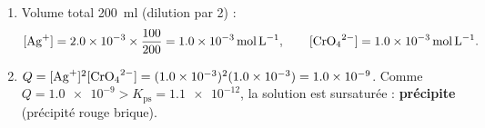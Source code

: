 \documentclass[11pt,a4paper]{article}
\begin{document}
\begin{corrige}
\begin{enumerate}[label=\alph*)]
  \item Volume total \qty{200}{\milli\litre} (dilution par 2) :
        \[ [\ce{Ag+}] = \num{2.0e-3}\times\dfrac{100}{200} = \qty{1.0e-3}{\mole\per\litre}, \qquad
           [\ce{CrO4^{2-}}] = \qty{1.0e-3}{\mole\per\litre}. \]
  \item $Q = [\ce{Ag+}]^{2}[\ce{CrO4^{2-}}] = (\num{1.0e-3})^{2}(\num{1.0e-3}) = \num{1.0e-9}$. Comme
        $Q=\num{1.0e-9} > K_{\mathrm{ps}}=\num{1.1e-12}$, la solution est sursaturée : \textbf{
        précipite} (précipité rouge brique).
\end{enumerate}
\end{corrige}
\end{document}
